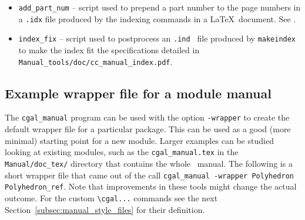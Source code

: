 \begin{itemize}
   \item \verb|add_part_num|%
         -- script used to prepend a part number to the
         page numbers in a {\tt .idx} file produced by the indexing commands in
         a \LaTeX\ document.
         See .
   \item \verb|index_fix|%
         -- script used to postprocess an {\tt .ind } file
         produced by {\tt makeindex} to make the index fit the specifications
         detailed in %
         {{\tt Manual\_tools/doc/cc\_manual\_index.pdf}}.
\end{itemize}
\ccModifierCrossRefOn

\subsection{Example wrapper file for a module manual\label{subsec:wrapper_module_manual}}

The \texttt{cgal\_manual} program can be used with the option
\texttt{-wrapper} to create the default wrapper file for a particular
package. This can be used as a good (more minimal) starting point for
a new module. Larger examples can be studied looking at existing
modules, such as the \texttt{cgal\_manual.tex} in the
\texttt{Manual/doc\_tex/} directory that contains the whole \cgal\
manual. The following is a short wrapper file that came out of the
call \texttt{cgal\_manual -wrapper Polyhedron Polyhedron\_ref}. Note
that improvements in these tools might change the actual outcome. For
the custom \verb|\cgal...| commands see the next
Section~\ref{subsec:manual_style_files} for their definition.

